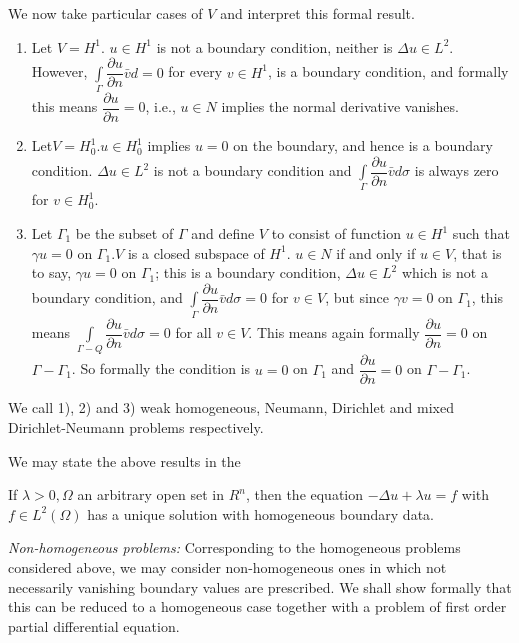 We now take particular cases of $V$ and interpret this formal result.
\begin{enumerate}[1)]
\item Let $V = H^1$. $u\in H^1$ is not a boundary condition,
  neither is $\Delta u \in L^2$. However, $\int\limits_{\Gamma}
  \dfrac {\partial u}{\partial n} \bar{v} d = 0$ for every $v
  \in H^1$, is a boundary condition, and formally this means
  $\dfrac{\partial u} {\partial n} = 0$, i.e., $u \in N$
  implies the normal derivative vanishes. 
\item Let\pageoriginale $V = H^1_0. u \in H^1_0$ implies $u =0$ on the
  boundary, and hence is a boundary condition. $\Delta u \in
  L^2$ is not a boundary condition and $\int\limits_{\Gamma} \dfrac{\partial
    u} {\partial n} \bar{v} d \sigma  $ is always zero for $v
  \in H^1_0$. 
\item Let $\Gamma_1$ be the subset of $\Gamma$ and define $V$ to
  consist of function $u \in H^1$ such that $\gamma u = 0$ on
  $\Gamma_1. V$ is a closed subspace of $H^1$. $u \in N$ if and
  only if $u \in V$, that is to say, $\gamma u = 0$ on $
  \Gamma_1$; this is a boundary condition, $\Delta u \in L^2$
  which is not a boundary condition, and $\int\limits_{\Gamma}
  \dfrac{\partial u}{\partial n} \bar{v} d \sigma = 0$ for $v
  \in V$, but since $\gamma v = 0$ on $\Gamma_1$, this means
  $\int\limits_{\Gamma-Q} \dfrac{\partial u} {\partial n} \bar{v} d \sigma =
  0$ for all $v \in V$. This means again formally $\dfrac
  {\partial u} {\partial n} = 0$ on $\Gamma - \Gamma_1$. So formally
  the condition is $u = 0$ on $\Gamma_1$ and $\dfrac {\partial
    u}{\partial n} = 0$ on $\Gamma - \Gamma_1$. 
\end{enumerate}

We call 1), 2) and 3) weak homogeneous, Neumann, Dirichlet and
mixed Dirichlet-Neumann problems respectively. 

We may state the above results in the
\begin{theorem}\label{lec6:sec3:subsec3:thm3.2}%
  If  $\lambda > 0, \Omega$ an arbitrary open set in $R^n$, then the
  equation $-\Delta u + \lambda u = f$ with $f \in L^2 (\Omega)$
  has a unique solution with homogeneous boundary data. 
\end{theorem}

\begin{remarks*}%
  {\em Non-homogeneous problems:} Corresponding to the homogeneous
  problems considered above, we may consider non-homogeneous ones in
  which not necessarily vanishing boundary values are prescribed. We
  shall show formally that this can be reduced to a homogeneous case
  together with a problem of first order partial differential equation. 
\end{remarks*}

